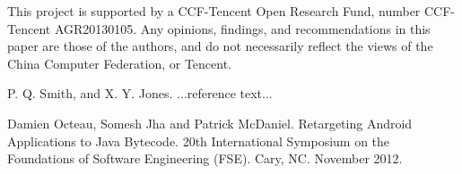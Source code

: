 \documentclass[preprint, cm]{sigplanconf}
\begin{document}
This project is supported by a CCF-Tencent
Open Research Fund, number CCF-Tencent AGR20130105. Any
opinions, findings, and recommendations in this paper are those
of the authors, and do not
necessarily reflect the views of the China Computer Federation, or
Tencent.





\begin{thebibliography}{}
\softraggedright

P. Q. Smith, and X. Y. Jones. ...reference text...

Damien Octeau, Somesh Jha and Patrick McDaniel. Retargeting 
Android Applications to Java Bytecode. 20th International 
Symposium on the Foundations of Software Engineering (FSE). Cary, NC. November 2012.

\end{thebibliography}
\end{document}
